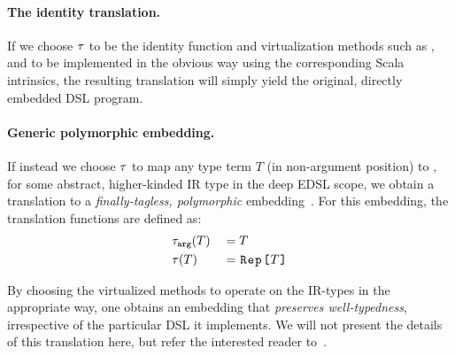 \paragraph{The identity translation.}  If we choose $\ttother$ to be
the identity function and virtualization methods such as ,
 and  to be implemented in the obvious way
using the corresponding Scala intrinsics, the resulting translation
will simply yield the original, directly embedded DSL program.

\paragraph{Generic polymorphic embedding.} If instead we choose
$\ttother$ to map any type term $T$ (in non-argument position)
to , for some abstract, higher-kinded IR type
 in the deep EDSL scope, we obtain a translation to a
\emph{finally-tagless, polymorphic}
embedding~\cite{carette_finally_2009,hofer_polymorphic_2008}. For this
embedding, the translation functions are defined as:
\begin{alignat*}{2}
&\ttarg[T]   & \; = \; & T \\
&\ttother[T] & \; = \; & \text{\code{Rep[}} T \text{\code{]}}
\end{alignat*}

By choosing the virtualized methods to operate on the IR-types in the
appropriate way, one obtains an embedding that \emph{preserves
  well-typedness}, irrespective of the particular DSL it implements.
We will not present the details of this translation here, but refer
the interested reader to~\cite{carette_finally_2009}.

